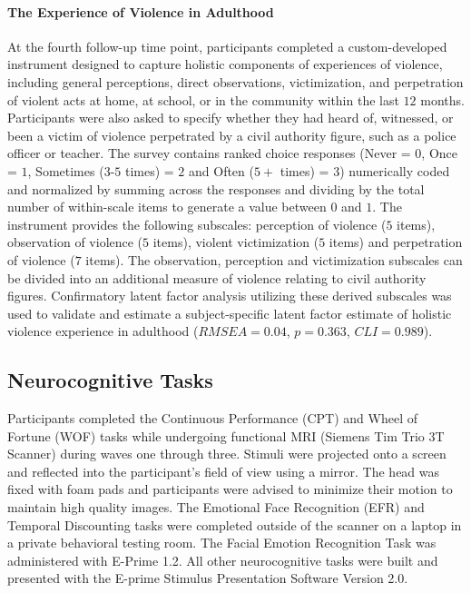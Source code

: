 \documentclass[utf8]{frontiersSCNS} %
\begin{document}
\paragraph{The Experience of Violence in Adulthood} At the fourth follow-up time point, participants completed a custom-developed instrument designed to capture holistic components of experiences of violence, including general perceptions, direct observations, victimization, and perpetration of violent acts at home, at school, or in the community within the last $12$ months. Participants were also asked to specify whether they had heard of, witnessed, or been a victim of violence perpetrated by a civil authority figure, such as a police officer or teacher. The survey contains ranked choice responses (Never = $0$, Once = $1$, Sometimes ($3$-$5$ times) = $2$ and Often ($5+$ times) = $3$) numerically coded and normalized by summing across the responses and dividing by the total number of within-scale items to generate a value between $0$ and $1$. The instrument provides the following subscales: perception of violence ($5$ items), observation of violence ($5$ items), violent victimization ($5$ items) and perpetration of violence ($7$ items). The observation, perception and victimization subscales can be divided into an additional measure of violence relating to civil authority figures. Confirmatory latent factor analysis utilizing these derived subscales was used to validate and estimate a subject-specific latent factor estimate of holistic violence experience in adulthood ($RMSEA = 0.04$, $p = 0.363$, $CLI = 0.989$).
\subsection{Neurocognitive Tasks}  Participants completed the Continuous Performance (CPT) and Wheel of Fortune (WOF) tasks while undergoing functional MRI (Siemens Tim Trio 3T Scanner) during waves one through three. Stimuli were projected onto a screen and reflected into the participant's field of view using a mirror. The head was fixed with foam pads and participants were advised to minimize their motion to maintain high quality images. The Emotional Face Recognition (EFR) and Temporal Discounting tasks  were completed outside of the scanner on a laptop in a private behavioral testing room. The Facial Emotion Recognition Task was administered with E-Prime 1.2. All other neurocognitive tasks were built and presented with the E-prime Stimulus Presentation Software Version 2.0\citep{schneider2002prime}. 
\end{document}
